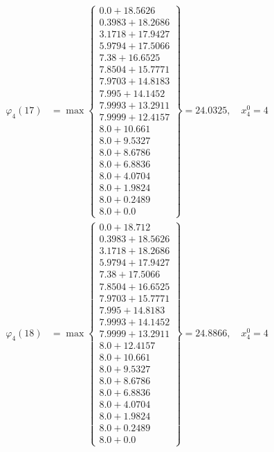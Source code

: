 \documentclass{article}
\begin{document}
\begin{align*}
  
\varphi_{4}(17) &= \max \left\{ \begin{array}{c}
0.0 + 18.5626 \\
 0.3983 + 18.2686 \\
 3.1718 + 17.9427 \\
 5.9794 + 17.5066 \\
 7.38 + 16.6525 \\
 7.8504 + 15.7771 \\
 7.9703 + 14.8183 \\
 7.995 + 14.1452 \\
 7.9993 + 13.2911 \\
 7.9999 + 12.4157 \\
 8.0 + 10.661 \\
 8.0 + 9.5327 \\
 8.0 + 8.6786 \\
 8.0 + 6.8836 \\
 8.0 + 4.0704 \\
 8.0 + 1.9824 \\
 8.0 + 0.2489 \\
 8.0 + 0.0
\end{array} \right\}=24.0325,\quad x_{4}^0=4\\
  
  
  
  
\varphi_{4}(18) &= \max \left\{ \begin{array}{c}
0.0 + 18.712 \\
 0.3983 + 18.5626 \\
 3.1718 + 18.2686 \\
 5.9794 + 17.9427 \\
 7.38 + 17.5066 \\
 7.8504 + 16.6525 \\
 7.9703 + 15.7771 \\
 7.995 + 14.8183 \\
 7.9993 + 14.1452 \\
 7.9999 + 13.2911 \\
 8.0 + 12.4157 \\
 8.0 + 10.661 \\
 8.0 + 9.5327 \\
 8.0 + 8.6786 \\
 8.0 + 6.8836 \\
 8.0 + 4.0704 \\
 8.0 + 1.9824 \\
 8.0 + 0.2489 \\
 8.0 + 0.0
\end{array} \right\}=24.8866,\quad x_{4}^0=4\\
  

\end{align*}
\end{document}
